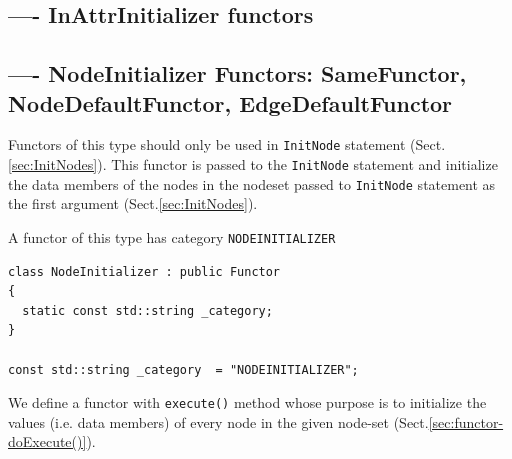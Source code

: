 \subsection{---- InAttrInitializer functors}
\label{sec:InAttrInitializer-functors}
\label{sec:functor-inAttrInitializer}

\subsection{---- NodeInitializer Functors: SameFunctor,
NodeDefaultFunctor, EdgeDefaultFunctor}
\label{sec:NodeInitializer-functors}
\label{sec:functor-nodeinitializer}
\label{sec:Same-functor}
\label{sec:NodefDefaultFunctor}
\label{sec:EdgeDefaultFunctor}

Functors of this type should only be used in \verb!InitNode! statement
(Sect.\ref{sec:InitNodes}). This functor is passed to the \verb!InitNode!
statement and initialize the data members of the nodes in the nodeset passed to
\verb!InitNode! statement as the first argument (Sect.\ref{sec:InitNodes}).

\begin{mdframed}

A functor of this type has category \verb!NODEINITIALIZER!
\begin{verbatim}
class NodeInitializer : public Functor
{
  static const std::string _category;
}

const std::string _category  = "NODEINITIALIZER";
\end{verbatim}
\end{mdframed}

We define a functor with \verb!execute()! method whose purpose is to initialize
the values (i.e. data members) of every node in the given node-set
(Sect.\ref{sec:functor-doExecute()}).

